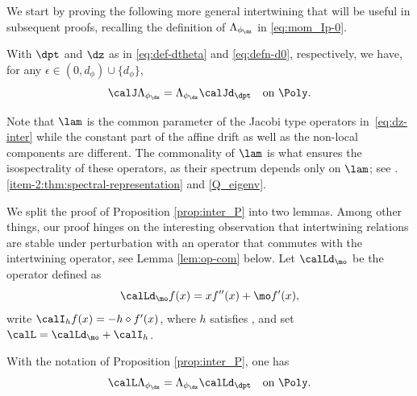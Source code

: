 We start by proving the following more general intertwining that will be useful in subsequent proofs, recalling the definition of $\Lambda_{\phi_{\dz}}$ in \eqref{eq:mom_Ip-0}.

\begin{proposition}
\label{prop:inter_P}
With $\dpt$ and $\dz$ as in \eqref{eq:def-dtheta} and \eqref{eq:defn-d0}, respectively, we have, for any $\epsilon \in (0,d_\phi) \cup \{d_\phi\}$,\vspace*{-3pt}
\begin{equation}
\label{eq:dz-inter}
\calJ \Lambda_{\phi_{\dz}} = \Lambda_{\phi_{\dz}} \calJd_{\dpt} \quad \text{on } \Poly.
\end{equation}
\end{proposition}

\begin{remark}
Note that $\lam$ is the common parameter of the Jacobi type operators in~\eqref{eq:dz-inter} while the constant part of the affine drift as well as the non-local components are different. The commonality of $\lam$ is what ensures the isospectrality of these operators, as their spectrum depends only on $\lam$; see .\eqref{item-2:thm:spectral-representation} and \eqref{Q_eigenv}.
\end{remark}

We split the proof of Proposition \ref{prop:inter_P} into two lemmas. Among other things, our proof hinges on the interesting observation that intertwining relations are stable under perturbation with an operator that commutes with the intertwining operator, see Lemma \ref{lem:op-com} below. Let $\calLd_\mo$ be the operator defined as\vspace*{-3pt}
\begin{equation}
\label{eq:defL}
\calLd_\mo f(x) = xf''(x) + \mo f'(x),
\end{equation}
write $\calI_h f(x) = - h \diamond f'(x)$, where $h$ satisfies , and set $\calL = \calLd_\mo + \calI_h$.

\begin{lemma} \label{lem:inter} With the notation of Proposition \ref{prop:inter_P}, one has
\begin{equation}
\calL \Lambda_{\phi_{\dz}} = \Lambda_{\phi_{\dz}}\calLd_{\dpt} \quad \mbox{on } \Poly.
\end{equation}
\end{lemma}

